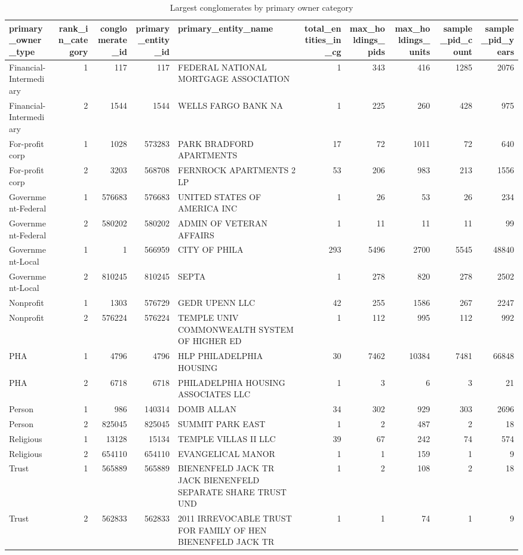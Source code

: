 \begin{table}

\caption{Largest conglomerates by primary owner category}
\centering
\begin{tabular}[t]{lrrrlrrrrr}
\toprule
primary\_owner\_type & rank\_in\_category & conglomerate\_id & primary\_entity\_id & primary\_entity\_name & total\_entities\_in\_cg & max\_holdings\_pids & max\_holdings\_units & sample\_pid\_count & sample\_pid\_years\\
\midrule
Financial-Intermediary & 1 & 117 & 117 & FEDERAL NATIONAL MORTGAGE ASSOCIATION & 1 & 343 & 416 & 1285 & 2076\\
Financial-Intermediary & 2 & 1544 & 1544 & WELLS FARGO BANK NA & 1 & 225 & 260 & 428 & 975\\
For-profit corp & 1 & 1028 & 573283 & PARK BRADFORD APARTMENTS & 17 & 72 & 1011 & 72 & 640\\
For-profit corp & 2 & 3203 & 568708 & FERNROCK APARTMENTS 2 LP & 53 & 206 & 983 & 213 & 1556\\
Government-Federal & 1 & 576683 & 576683 & UNITED STATES OF AMERICA INC & 1 & 26 & 53 & 26 & 234\\
Government-Federal & 2 & 580202 & 580202 & ADMIN OF VETERAN AFFAIRS & 1 & 11 & 11 & 11 & 99\\
Government-Local & 1 & 1 & 566959 & CITY OF PHILA & 293 & 5496 & 2700 & 5545 & 48840\\
Government-Local & 2 & 810245 & 810245 & SEPTA & 1 & 278 & 820 & 278 & 2502\\
Nonprofit & 1 & 1303 & 576729 & GEDR UPENN LLC & 42 & 255 & 1586 & 267 & 2247\\
Nonprofit & 2 & 576224 & 576224 & TEMPLE UNIV COMMONWEALTH SYSTEM OF HIGHER ED & 1 & 112 & 995 & 112 & 992\\
PHA & 1 & 4796 & 4796 & HLP PHILADELPHIA HOUSING & 30 & 7462 & 10384 & 7481 & 66848\\
PHA & 2 & 6718 & 6718 & PHILADELPHIA HOUSING ASSOCIATES LLC & 1 & 3 & 6 & 3 & 21\\
Person & 1 & 986 & 140314 & DOMB ALLAN & 34 & 302 & 929 & 303 & 2696\\
Person & 2 & 825045 & 825045 & SUMMIT PARK EAST & 1 & 2 & 487 & 2 & 18\\
Religious & 1 & 13128 & 15134 & TEMPLE VILLAS II LLC & 39 & 67 & 242 & 74 & 574\\
Religious & 2 & 654110 & 654110 & EVANGELICAL MANOR & 1 & 1 & 159 & 1 & 9\\
Trust & 1 & 565889 & 565889 & BIENENFELD JACK TR JACK BIENENFELD SEPARATE SHARE TRUST UND & 1 & 2 & 108 & 2 & 18\\
Trust & 2 & 562833 & 562833 & 2011 IRREVOCABLE TRUST FOR FAMILY OF HEN BIENENFELD JACK TR & 1 & 1 & 74 & 1 & 9\\
\bottomrule
\end{tabular}
\end{table}
